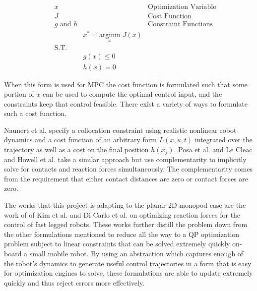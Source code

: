 \documentclass[conference]{IEEEtran}
\begin{document}
\begin{align*}
    \quad & x                &                                           & \text{Optimization Variable} \\
          & J                &                                           & \text{Cost Function}         \\
          & g \text{ and } h &                                           & \text{Constraint Functions}  \\
          &                  & x^* = \underset{x}{\text{argmin}} \; J(x)                                \\
          & \text{S.T.}      &                                                                          \\
          &                  & g(x) \leq 0                                                              \\
          &                  & h(x) = 0
\end{align*}

When this form is used for MPC the cost function is formulated such that some portion of \(x\) can be used to compute the optimal control input, and the constraints keep that control feasible.
There exist a variety of ways to formulate such a cost function.

Naunert et al. \cite{neunert_whole-body_2018} specify a collocation constraint using realistic nonlinear robot dynamics and a cost function of an arbitrary form \(L(x, u, t)\) integrated over the trajectory as well as a cost on the final position \(h(x_f)\).
Posa et al. \cite{posa_direct_2014} and Le Cleac and Howell et al. \cite{cleach_fast_2023} take a similar approach but use complementarity to implicitly solve for contacts and reaction forces simultaneously.
The complementarity comes from the requirement that either contact distances are zero or contact forces are zero.

The works that this project is adapting to the planar 2D monopod case are the work of of Kim et al. \cite{kim_highly_2019} and Di Carlo et al. \cite{di_carlo_dynamic_2018} on optimizing reaction forces for the control of fast legged robots.
These works further distill the problem down from the other formulations mentioned to reduce all the way to a QP optimization problem subject to linear constraints that can be solved extremely quickly on-board a small mobile robot.
By using an abstraction which captures enough of the robot's dynamics to generate useful control trajectories in a form that is easy for optimization engines to solve, these formulations are able to update extremely quickly and thus reject errors more effectively.
\end{document}
